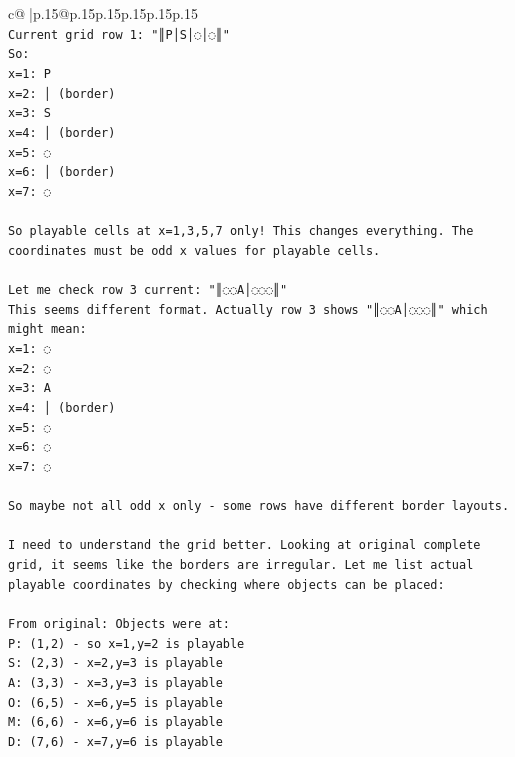 \documentclass{article}
\begin{document}
{\begin{supertabular}{c@{$\;$}|p{.15\linewidth}@{}p{.15\linewidth}p{.15\linewidth}p{.15\linewidth}p{.15\linewidth}p{.15\linewidth}}
{{{\\ 
\texttt{Current grid row 1: "║P│S│◌│◌║"} \\
\texttt{So:} \\
\texttt{x=1: P} \\
\texttt{x=2: │ (border)} \\
\texttt{x=3: S  } \\
\texttt{x=4: │ (border)} \\
\texttt{x=5: ◌} \\
\texttt{x=6: │ (border)} \\
\texttt{x=7: ◌} \\
\\ 
\texttt{So playable cells at x=1,3,5,7 only! This changes everything. The coordinates must be odd x values for playable cells.} \\
\\ 
\texttt{Let me check row 3 current: "║◌◌A│◌◌◌║" } \\
\texttt{This seems different format. Actually row 3 shows "║◌◌A│◌◌◌║" which might mean:} \\
\texttt{x=1: ◌} \\
\texttt{x=2: ◌} \\
\texttt{x=3: A} \\
\texttt{x=4: │ (border)} \\
\texttt{x=5: ◌} \\
\texttt{x=6: ◌} \\
\texttt{x=7: ◌} \\
\\ 
\texttt{So maybe not all odd x only {-} some rows have different border layouts.} \\
\\ 
\texttt{I need to understand the grid better. Looking at original complete grid, it seems like the borders are irregular. Let me list actual playable coordinates by checking where objects can be placed:} \\
\\ 
\texttt{From original: Objects were at:} \\
\texttt{P: (1,2) {-} so x=1,y=2 is playable} \\
\texttt{S: (2,3) {-} x=2,y=3 is playable} \\
\texttt{A: (3,3) {-} x=3,y=3 is playable} \\
\texttt{O: (6,5) {-} x=6,y=5 is playable  } \\
\texttt{M: (6,6) {-} x=6,y=6 is playable} \\
\texttt{D: (7,6) {-} x=7,y=6 is playable} \\
}}}
\end{supertabular}}
\end{document}

